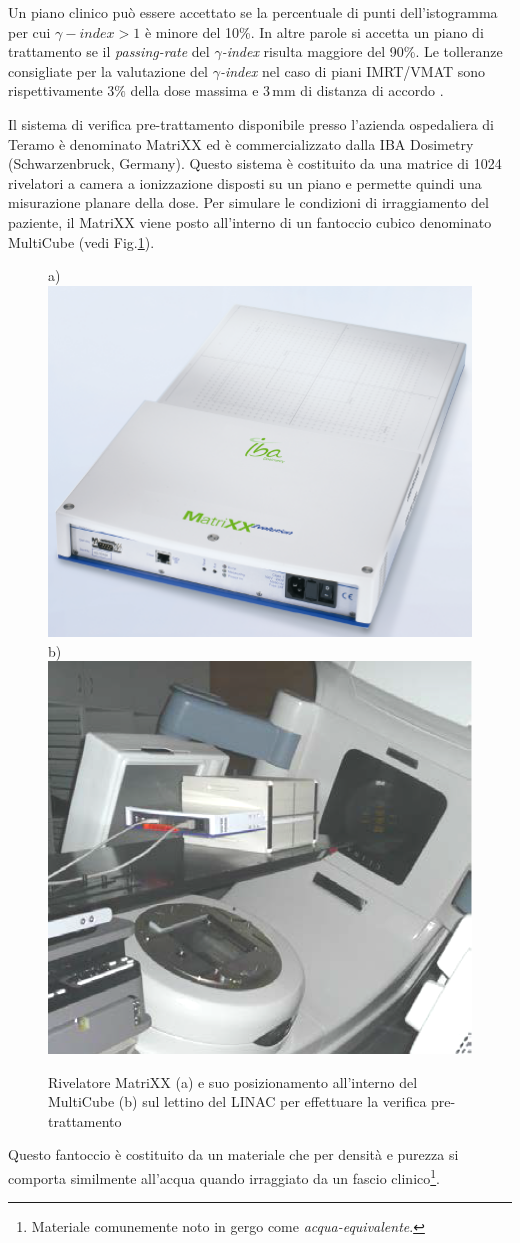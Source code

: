 Un piano clinico può essere accettato se la percentuale di punti dell'istogramma per cui $\gamma-index > 1$ è minore del 10\%. In altre parole si accetta un piano di trattamento se il \textit{passing-rate} del $\gamma$\textit{-index} risulta maggiore del 90\%. Le tolleranze consigliate per la valutazione del $\gamma$\textit{-index} nel caso di piani IMRT/VMAT sono rispettivamente $3\%$ della dose massima e $3\,$mm di distanza di accordo \cite{Ezzell2009}.

Il sistema di verifica pre-trattamento disponibile presso l'azienda ospedaliera di Teramo è denominato MatriXX ed è commercializzato dalla IBA Dosimetry (Schwarzenbruck, Germany). Questo sistema è costituito da una matrice di 1024 rivelatori a camera a ionizzazione disposti su un piano e permette quindi una misurazione planare della dose. Per simulare le condizioni di irraggiamento del paziente, il MatriXX viene posto all'interno di un fantoccio cubico denominato MultiCube (vedi Fig.\ref{fig:MatriXX}). 
\begin{figure}
\centering
a)\includegraphics[width=.43\textwidth]{./cap2/MatriXX_Alone.png}
b)\includegraphics[width=.43\textwidth]{./cap2/MatriXX_Cube.png}
\caption{Rivelatore MatriXX (a) e suo posizionamento all'interno del MultiCube (b) sul lettino del LINAC per effettuare la verifica pre-trattamento}
\label{fig:MatriXX}
\end{figure}
Questo fantoccio è costituito da un materiale che per densità e purezza si comporta similmente all'acqua quando irraggiato da un fascio clinico\footnote{Materiale comunemente noto in gergo come \textit{acqua-equivalente}.}. 

